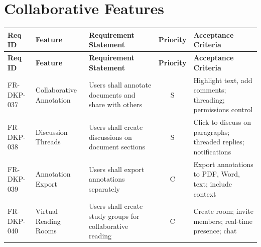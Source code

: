 \documentclass[12pt,a4paper]{report}
\begin{document}
\section{Collaborative Features}
\begin{longtable}{|p{2cm}|p{3cm}|p{5cm}|c|p{3cm}|}
\hline
\textbf{Req ID} & \textbf{Feature} & \textbf{Requirement Statement} & \textbf{Priority} & \textbf{Acceptance Criteria} \\ \hline
\endfirsthead
\hline
\textbf{Req ID} & \textbf{Feature} & \textbf{Requirement Statement} & \textbf{Priority} & \textbf{Acceptance Criteria} \\ \hline
\endhead
FR-DKP-037 & Collaborative Annotation & Users shall annotate documents and share with others & S & Highlight text, add comments; threading; permissions control \\ \hline
FR-DKP-038 & Discussion Threads & Users shall create discussions on document sections & S & Click-to-discuss on paragraphs; threaded replies; notifications \\ \hline
FR-DKP-039 & Annotation Export & Users shall export annotations separately & C & Export annotations to PDF, Word, text; include context \\ \hline
FR-DKP-040 & Virtual Reading Rooms & Users shall create study groups for collaborative reading & C & Create room; invite members; real-time presence; chat \\ \hline
\end{longtable}
\end{document}
